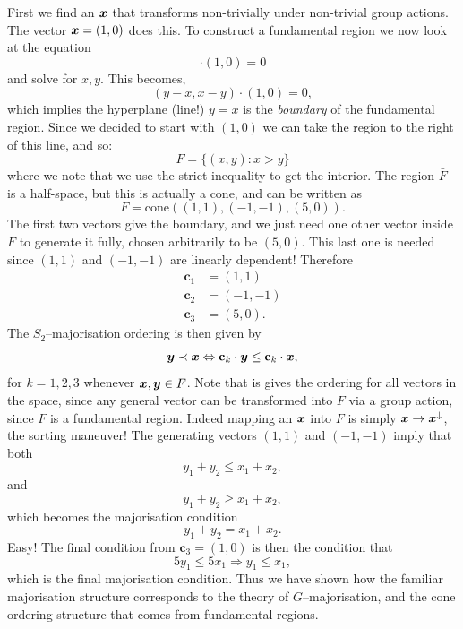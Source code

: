 \documentclass[pra,
aps,
twocolumn,
superscriptaddress,
groupedaddress,
nofootinbib,
reprint
]{revtex4-1}
\begin{document}
First we find an $\boldsymbol{x}$ that transforms non-trivially under non-trivial group actions. The vector $\boldsymbol{x}=(1,0)$ does this. To construct a fundamental region we now look at the equation 
\begin{equation}
[g.(x,y) - (x,y)] \cdot (1,0) = 0
\end{equation}
and solve for $x,y$. This becomes,
\begin{equation}
(y-x, x-y)\cdot(1,0)=0,
\end{equation}
which implies the hyperplane (line!) $y=x$ is the \emph{boundary} of the fundamental region. Since we decided to start with $(1,0)$ we can take the region to the right of this line, and so:
\begin{equation}
F = \{(x,y) : x>y \}
\end{equation}
where we note that we use the strict inequality to get the interior. The region $\bar{F}$ is a half-space, but this is actually a cone, and can be written as
\begin{equation}
F= \mbox{cone}( (1,1),(-1,-1), (5,0)).
\end{equation}
The first two vectors give the boundary, and we just need one other vector inside $F$ to generate it fully, chosen arbitrarily to be $(5,0)$. This last one is needed since $(1,1)$ and $(-1,-1)$ are linearly dependent! Therefore
\begin{align}
\mathbf{c}_1 &= (1,1) \nonumber \\
\mathbf{c}_2 &= (-1,-1) \nonumber \\
\mathbf{c}_3 &= (5,0).
\end{align}
The $S_2$--majorisation ordering is then given by
\begin{equation}
\boldsymbol{y} \prec \boldsymbol{x} \Leftrightarrow \mathbf{c}_k \cdot \boldsymbol{y} \le  \mathbf{c}_k \cdot \boldsymbol{x},
\end{equation}
for $k=1,2,3$ whenever $\boldsymbol{x},\boldsymbol{y} \in F$. Note that is gives the ordering for all vectors in the space, since any general vector can be transformed into $F$ via a group action, since $F$ is a fundamental region. Indeed mapping an $\boldsymbol{x}$ into $F$ is simply $\boldsymbol{x} \rightarrow \boldsymbol{x}^\downarrow$, the sorting maneuver!
The generating vectors $(1,1)$ and $(-1,-1)$ imply that both 
\begin{equation}
y_1 + y_2 \le x_1 +x_2,
\end{equation}
and
\begin{equation}
y_1 + y_2 \ge x_1 +x_2,
\end{equation}
which becomes the majorisation condition
\begin{equation}
y_1+y_2 = x_1 + x_2.
\end{equation}
Easy! The final condition from $\mathbf{c}_3=(1,0)$ is then the condition that
\begin{equation}
5y_1 \le 5x_1 \Rightarrow y_1 \le x_1,
\end{equation}
which is the final majorisation condition. Thus we have shown how the familiar majorisation structure corresponds to the theory of $G$--majorisation, and the cone ordering structure that comes from fundamental regions.
\end{document}
